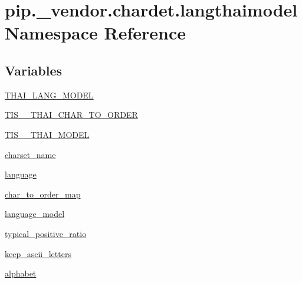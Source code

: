\hypertarget{namespacepip_1_1__vendor_1_1chardet_1_1langthaimodel}{}\section{pip.\+\_\+vendor.\+chardet.\+langthaimodel Namespace Reference}
\label{namespacepip_1_1__vendor_1_1chardet_1_1langthaimodel}
\subsection*{Variables}
\begin{DoxyCompactItemize}
\item 
\hyperlink{namespacepip_1_1__vendor_1_1chardet_1_1langthaimodel_a30688159990fe5729dee2bb804acac9d}{T\+H\+A\+I\+\_\+\+L\+A\+N\+G\+\_\+\+M\+O\+D\+EL}
\item 
\hyperlink{namespacepip_1_1__vendor_1_1chardet_1_1langthaimodel_a6d0cc07e1cae9469964c9169a3321099}{T\+I\+S\+\_\+\_\+\+T\+H\+A\+I\+\_\+\+C\+H\+A\+R\+\_\+\+T\+O\+\_\+\+O\+R\+D\+ER}
\item 
\hyperlink{namespacepip_1_1__vendor_1_1chardet_1_1langthaimodel_a7032b46a3ea9e22eaf98956285319060}{T\+I\+S\+\_\+\_\+\+T\+H\+A\+I\+\_\+\+M\+O\+D\+EL}
\item 
\hyperlink{namespacepip_1_1__vendor_1_1chardet_1_1langthaimodel_a7bb8f1df3d128ac85902791aa707e1d6}{charset\+\_\+name}
\item 
\hyperlink{namespacepip_1_1__vendor_1_1chardet_1_1langthaimodel_a16a02efe6df928feefe56776afff68bc}{language}
\item 
\hyperlink{namespacepip_1_1__vendor_1_1chardet_1_1langthaimodel_acc2aba5b53ba8e18ad66e4fa4e979198}{char\+\_\+to\+\_\+order\+\_\+map}
\item 
\hyperlink{namespacepip_1_1__vendor_1_1chardet_1_1langthaimodel_a93c6b40466f49d212eb3a226fcf2e825}{language\+\_\+model}
\item 
\hyperlink{namespacepip_1_1__vendor_1_1chardet_1_1langthaimodel_a9a218dd0be7db0c0cb40d668a2423597}{typical\+\_\+positive\+\_\+ratio}
\item 
\hyperlink{namespacepip_1_1__vendor_1_1chardet_1_1langthaimodel_a6938563d9dd25cb137e65ebe1378653b}{keep\+\_\+ascii\+\_\+letters}
\item 
\hyperlink{namespacepip_1_1__vendor_1_1chardet_1_1langthaimodel_ad081e1c12a3b01e4d4238d881e8f218d}{alphabet}
\end{DoxyCompactItemize}


